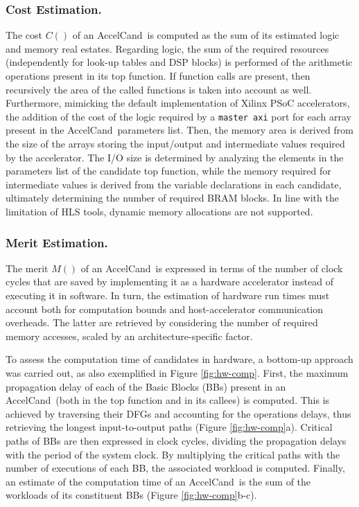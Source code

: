 \documentclass[]{usiinfthesis}
\newcommand{\candidate}{{AccelCand}}
\begin{document}
\subsubsection{Cost Estimation.}
The cost $C()$ of an \candidate\ is computed as the sum of its estimated logic and memory 
real estates. Regarding logic, the sum of the required resources (independently for look-up 
tables and DSP blocks) is performed of the arithmetic operations present in its top function.
If function calls are present, then recursively the area of the called functions is taken into
account as well. Furthermore, mimicking the default implementation of Xilinx PSoC accelerators, 
the addition of the cost of the logic required by a \texttt{master axi} port for each array 
present in the \candidate\ parameters list.
Then, the memory area is derived from the size of the arrays storing the input/output and intermediate 
values required by the accelerator. The I/O size is determined by analyzing the elements in the 
parameters list of the candidate top function, while the memory required for intermediate values is 
derived from the variable declarations in each candidate, ultimately determining the number of required 
BRAM blocks. In line with the limitation of HLS tools, dynamic memory allocations are not supported.\par

\subsubsection{Merit Estimation.}
The merit $M()$ of an \candidate\ is expressed in terms of the number of clock cycles that are saved by 
implementing it as a hardware accelerator instead of executing it in software. In turn, the estimation 
of hardware run times must account both for computation bounds and host-accelerator communication overheads.  
The latter are retrieved by considering the number of required memory accesses, scaled by an 
architecture-specific factor.\par

To assess the computation time of candidates in hardware, a bottom-up approach was carried out, as also 
exemplified in Figure \ref{fig:hw-comp}. First, the maximum propagation delay of each of the Basic Blocks 
(BBs) present in an \candidate\ (both in the top function and in its callees) is computed.  This is 
achieved by traversing their DFGs and accounting for the operations delays, thus retrieving the longest 
input-to-output paths (Figure \ref{fig:hw-comp}a).  Critical paths of BBs are then expressed in clock cycles, 
dividing the propagation delays with the period of the system clock. By multiplying the critical paths with 
the number of executions of each BB, the associated workload is computed. Finally, an estimate of the computation time of an \candidate\ is the sum of the workloads of its constituent BBs 
(Figure \ref{fig:hw-comp}b-c).\par
\end{document}
